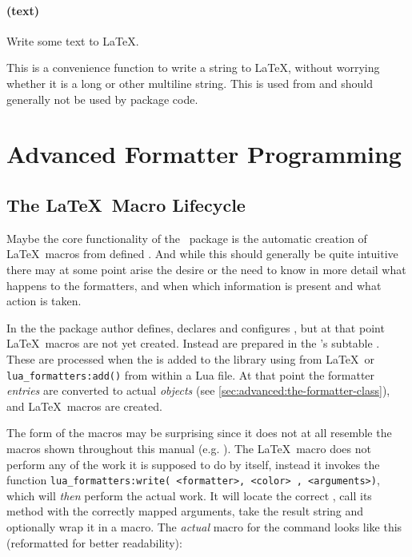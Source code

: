 \documentclass[12pt]{scrartcl}
\begin{document}
\paragraph{ (text)}

Write some text to \LaTeX.

This is a convenience function to write a string to \LaTeX, without worrying
whether it is a long or other multiline string.  This is used from
 and should generally not be used by package code.


\section{Advanced Formatter Programming}
\label{sec:advanced-programming}


\subsection{The \LaTeX\ Macro Lifecycle}
\label{sec:latex-macro-lifecycle}

Maybe the core functionality of the \luaformatters\ package is the
automatic creation of \LaTeX\ macros from defined .
And while this should generally be quite intuitive there may at some point arise
the desire or the need to know in more detail what happens to the formatters,
and when which information is present and what action is taken.

In the  the package author defines, declares and
configures , but at that point \LaTeX\ macros are
not yet created. Instead  are prepared
in the 's subtable .  These are
processed when the  is added to the library using
 from \LaTeX\ or \texttt{lua_formatters:add()} from
within a Lua file.  At that point the formatter \emph{entries} are converted to
actual  \emph{objects} (see
\vref{sec:advanced:the-formatter-class}), and \LaTeX\ macros are created.

The form of the macros may be surprising since it does not at all resemble the
macros shown throughout this manual (e.g. ).  The
\LaTeX\ macro does not perform any of the work it is supposed to do by itself,
instead it invokes the function \texttt{lua_formatters:write({
<formatter>, <color> }, <arguments>)}, which will \emph{then} perform the actual
work.  It will locate the correct , call its 
method with the correctly mapped arguments, take the result string and
optionally wrap it in a  macro.  The \emph{actual} macro for the  command looks like this (reformatted for better readability):
\end{document}
